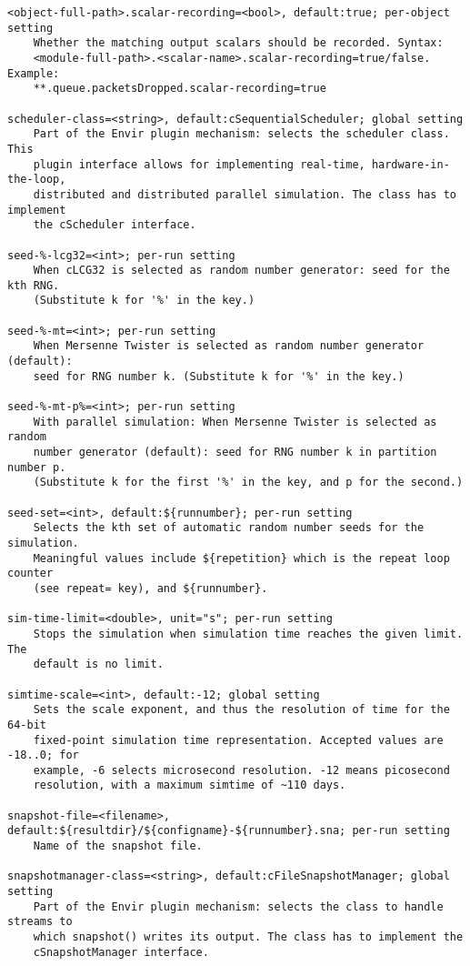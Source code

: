 \begin{verbatim}
<object-full-path>.scalar-recording=<bool>, default:true; per-object setting
    Whether the matching output scalars should be recorded. Syntax:
    <module-full-path>.<scalar-name>.scalar-recording=true/false. Example:
    **.queue.packetsDropped.scalar-recording=true

scheduler-class=<string>, default:cSequentialScheduler; global setting
    Part of the Envir plugin mechanism: selects the scheduler class. This
    plugin interface allows for implementing real-time, hardware-in-the-loop,
    distributed and distributed parallel simulation. The class has to implement
    the cScheduler interface.

seed-%-lcg32=<int>; per-run setting
    When cLCG32 is selected as random number generator: seed for the kth RNG.
    (Substitute k for '%' in the key.)

seed-%-mt=<int>; per-run setting
    When Mersenne Twister is selected as random number generator (default):
    seed for RNG number k. (Substitute k for '%' in the key.)

seed-%-mt-p%=<int>; per-run setting
    With parallel simulation: When Mersenne Twister is selected as random
    number generator (default): seed for RNG number k in partition number p.
    (Substitute k for the first '%' in the key, and p for the second.)

seed-set=<int>, default:${runnumber}; per-run setting
    Selects the kth set of automatic random number seeds for the simulation.
    Meaningful values include ${repetition} which is the repeat loop counter
    (see repeat= key), and ${runnumber}.

sim-time-limit=<double>, unit="s"; per-run setting
    Stops the simulation when simulation time reaches the given limit. The
    default is no limit.

simtime-scale=<int>, default:-12; global setting
    Sets the scale exponent, and thus the resolution of time for the 64-bit
    fixed-point simulation time representation. Accepted values are -18..0; for
    example, -6 selects microsecond resolution. -12 means picosecond
    resolution, with a maximum simtime of ~110 days.

snapshot-file=<filename>, default:${resultdir}/${configname}-${runnumber}.sna; per-run setting
    Name of the snapshot file.

snapshotmanager-class=<string>, default:cFileSnapshotManager; global setting
    Part of the Envir plugin mechanism: selects the class to handle streams to
    which snapshot() writes its output. The class has to implement the
    cSnapshotManager interface.


\end{verbatim}

